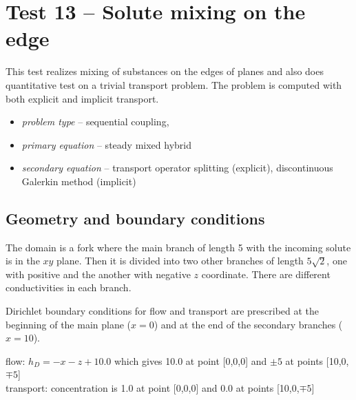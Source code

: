 

\section{Test 13 -- Solute mixing on the edge}
This test realizes mixing of substances on the edges of planes and also does quantitative test on a trivial transport problem. The problem is computed with both explicit and implicit transport.

\begin{itemize} 
    \item \emph{problem type} -- sequential coupling, 
    \item \emph{primary equation} -- steady mixed hybrid
    \item \emph{secondary equation} -- transport operator splitting (explicit), discontinuous Galerkin method (implicit)
  \end{itemize}

\subsection*{Geometry and boundary conditions}
The domain is a fork where the main branch of length 5 with the incoming solute is in the $xy$ plane. Then it is divided into two other branches of length $5\sqrt{2}$, one with positive and the another with negative $z$ coordinate. There are different conductivities in each branch.

Dirichlet boundary conditions for flow and transport are prescribed at the beginning of the main plane ($x=0$) and at the end of the secondary branches ($x=10$).

flow: $h_D=-x-z+10.0$ which gives 10.0 at point [0,0,0] and $\pm5$ at points [10,0,$\mp5$]\\
transport: concentration is 1.0 at point [0,0,0] and 0.0 at points [10,0,$\mp5$]

